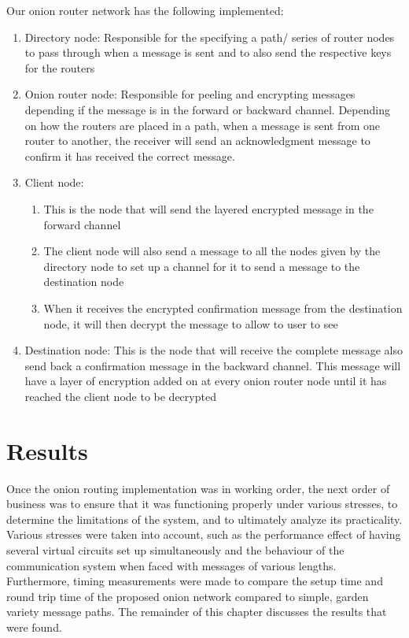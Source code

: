 \documentclass[10pt]{report}
\begin{document}
Our onion router network has the following implemented:
\begin{enumerate}
	\item Directory node: Responsible for the specifying a path/ series of router nodes to pass
		through when a message is sent and to also send the respective keys for the routers
	\item Onion router node: Responsible for peeling and encrypting messages depending if the
		message is in the forward or backward channel. Depending on how the routers are placed in a
		path, when a message is sent from one router to another, the receiver will send an
		acknowledgment message to confirm it has received the correct message.
    \item Client node:
    \begin{enumerate}
        \item This is the node that will send the layered encrypted message in the forward channel
		\item The client node will also send a message to all the nodes given by the directory node
			to set up a channel for it to send a message to the destination node
		\item When it receives the encrypted confirmation message from the destination node, it will
			then decrypt the message to allow to user to see
    \end{enumerate}
	\item Destination node: This is the node that will receive the complete message also send back a
		confirmation message in the backward channel. This message will have a layer of encryption
		added on at every onion router node until it has reached the client node to be decrypted
\end{enumerate}

\chapter{Results}
Once the onion routing implementation was in working order, the next order of business was to ensure
that it was functioning properly under various stresses, to determine the limitations of the system,
and to ultimately analyze its practicality. Various stresses were taken into account, such as the
performance effect of having several virtual circuits set up simultaneously and the behaviour of the
communication system when faced with messages of various lengths. Furthermore, timing measurements
were made to compare the setup time and round trip time of the proposed onion network compared to
simple, garden variety message paths. The remainder of this chapter discusses the results that were
found.
\end{document}
